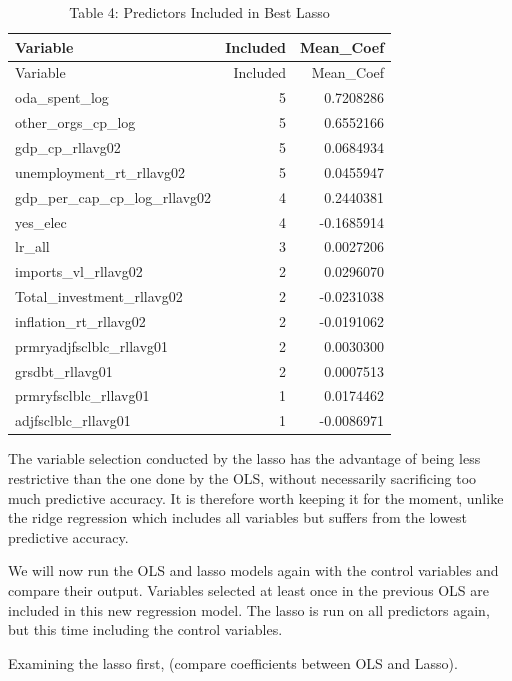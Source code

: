 \documentclass[
]{article}
\begin{document}
\begin{longtable}[]{@{}lrr@{}}
\caption{Table 4: Predictors Included in Best Lasso}\tabularnewline
\toprule\noalign{}
Variable & Included & Mean\_Coef \\
\midrule\noalign{}
\endfirsthead
\toprule\noalign{}
Variable & Included & Mean\_Coef \\
\midrule\noalign{}
\endhead
\bottomrule\noalign{}
\endlastfoot
oda\_spent\_log & 5 & 0.7208286 \\
other\_orgs\_cp\_log & 5 & 0.6552166 \\
gdp\_cp\_rllavg02 & 5 & 0.0684934 \\
unemployment\_rt\_rllavg02 & 5 & 0.0455947 \\
gdp\_per\_cap\_cp\_log\_rllavg02 & 4 & 0.2440381 \\
yes\_elec & 4 & -0.1685914 \\
lr\_all & 3 & 0.0027206 \\
imports\_vl\_rllavg02 & 2 & 0.0296070 \\
Total\_investment\_rllavg02 & 2 & -0.0231038 \\
inflation\_rt\_rllavg02 & 2 & -0.0191062 \\
prmryadjfsclblc\_rllavg01 & 2 & 0.0030300 \\
grsdbt\_rllavg01 & 2 & 0.0007513 \\
prmryfsclblc\_rllavg01 & 1 & 0.0174462 \\
adjfsclblc\_rllavg01 & 1 & -0.0086971 \\
\end{longtable}

The variable selection conducted by the lasso has the advantage of being
less restrictive than the one done by the OLS, without necessarily
sacrificing too much predictive accuracy. It is therefore worth keeping
it for the moment, unlike the ridge regression which includes all
variables but suffers from the lowest predictive accuracy.

We will now run the OLS and lasso models again with the control
variables and compare their output. Variables selected at least once in
the previous OLS are included in this new regression model. The lasso is
run on all predictors again, but this time including the control
variables.

Examining the lasso first, (compare coefficients between OLS and Lasso).
\end{document}
